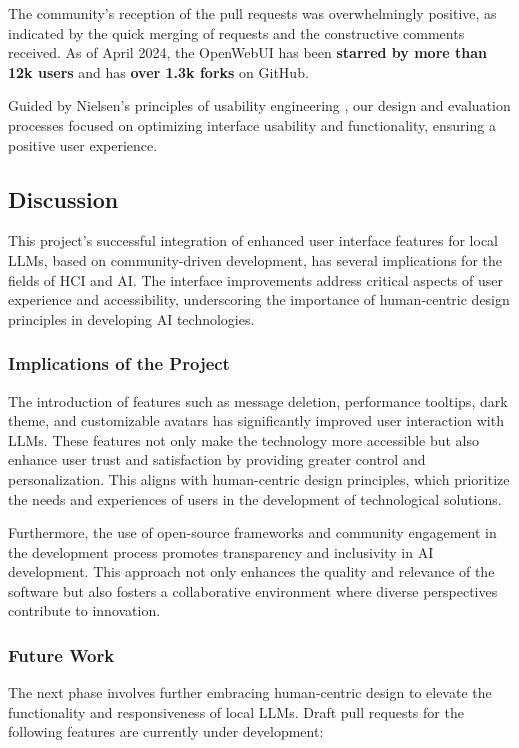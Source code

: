 \documentclass[sigconf, nonacm]{acmart}
\begin{document}
The community's reception of the pull requests was overwhelmingly positive, as indicated by the quick merging of requests and the constructive comments received. As of April 2024, the OpenWebUI has been\textbf{ starred by more than 12k users} and has \textbf{over 1.3k forks} on GitHub. 

Guided by Nielsen's principles of usability engineering \cite{nielsen1994usability}, our design and evaluation processes focused on optimizing interface usability and functionality, ensuring a positive user experience.

\subsection{Discussion}
This project's successful integration of enhanced user interface features for local LLMs, based on community-driven development, has several implications for the fields of HCI and AI. The interface improvements address critical aspects of user experience and accessibility, underscoring the importance of human-centric design principles in developing AI technologies.

\subsubsection{Implications of the Project}
The introduction of features such as message deletion, performance tooltips, dark theme, and customizable avatars has significantly improved user interaction with LLMs. These features not only make the technology more accessible but also enhance user trust and satisfaction by providing greater control and personalization. This aligns with human-centric design principles, which prioritize the needs and experiences of users in the development of technological solutions.

Furthermore, the use of open-source frameworks and community engagement in the development process promotes transparency and inclusivity in AI development. This approach not only enhances the quality and relevance of the software but also fosters a collaborative environment where diverse perspectives contribute to innovation.

\subsubsection{Future Work}
The next phase involves further embracing human-centric design to elevate the functionality and responsiveness of local LLMs. Draft pull requests for the following features are currently under development:
\end{document}

